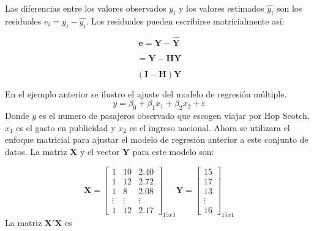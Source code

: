 \documentclass[
]{book}
\begin{document}
Las diferencias entre los valores observados \(y_{i}\) y los valores estimados \(\hat{y_{i}}\) son los residuales \(e_{i}=y_{i}-\hat{y_{i}}\). Los residuales pueden escribirse matricialmente así:

\[
\begin{equation}
\boldsymbol{e=Y-\hat{Y}}
\label{eq:vector-residuos-regresion-lineal}
\end{equation}
\]

\[
\begin{equation}
\boldsymbol{=Y-HY}
\end{equation}
\]

\[
\boldsymbol{(I-H)Y}
\]

En el ejemplo anterior se ilustro el ajuste del modelo de regresión múltiple. \[
\begin{equation}
y=\beta_{0}+\beta_{1}x_{1}+\beta_{2}x_{2}+\varepsilon
\end{equation}
\] Donde \(y\) es el numero de pasajeros observado que escogen viajar por Hop Scotch, \(x_{1}\) es el gasto en publicidad y \(x_{2}\) es el ingreso nacional. Ahora se utilizara el enfoque matricial para ajustar el modelo de regresión anterior a este conjunto de datos. La matriz \(\boldsymbol{X}\) y el vector \(\boldsymbol{Y}\) para este modelo son:

\[
\begin{equation}
\boldsymbol{X} = \begin{bmatrix}
 1&  10& 2.40\\ 
 1&  12& 2.72\\ 
 1&  8& 2.08\\ 
 \vdots &  \vdots& \vdots\\ 
 1&  12& 2.17
\end{bmatrix}_{15x3}
\boldsymbol{Y} = \begin{bmatrix}
15\\ 
17\\ 
13\\ 
\vdots \\ 
16
\end{bmatrix}_{15x1}
\label{eq:matrices-regresion-multiple}
\end{equation}
\] La matriz \(\boldsymbol{X'X}\) es
\end{document}
